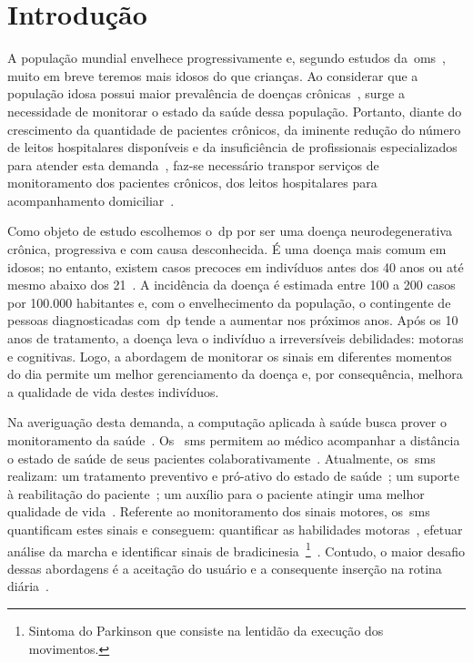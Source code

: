 \chapter{Introdu\c{c}\~{a}o} \label{chapter:intro}

A população mundial envelhece progressivamente e, segundo estudos da~\ac{oms}~\cite{ageing2011}, muito em breve teremos mais idosos do que crianças. Ao considerar que a população idosa possui maior prevalência de doenças crônicas~\cite{prevcronica2009}, surge a necessidade de monitorar o estado da saúde dessa população. Portanto, diante do crescimento da quantidade de pacientes crônicos, da iminente redução do número de leitos hospitalares disponíveis e da insuficiência de profissionais especializados para atender esta demanda~\cite{healthmonitoring2013}, faz-se necessário transpor serviços de monitoramento dos pacientes crônicos, dos leitos hospitalares para acompanhamento domiciliar~\cite{homecarebrazil2011}. 

Como objeto de estudo escolhemos o~\ac{dp} por ser uma doença neurodegenerativa crônica, progressiva e com causa desconhecida. É uma doença mais comum em idosos; no entanto, existem casos precoces em indivíduos antes dos 40 anos ou até mesmo abaixo dos 21~\cite{menezes2003}. A incidência da doença é estimada entre 100 a 200 casos por 100.000 habitantes e, com o envelhecimento da população, o contingente de pessoas diagnosticadas com~\ac{dp} tende a aumentar nos próximos anos. Após os 10 anos de tratamento, a doença leva o indivíduo a irreversíveis debilidades: motoras e cognitivas. Logo, a abordagem de monitorar os sinais em diferentes momentos do dia permite um melhor gerenciamento da doença e, por consequência, melhora a qualidade de vida destes indivíduos.

Na averiguação desta demanda, a computação aplicada à saúde busca prover o monitoramento da saúde~\cite{healthmonitoring2013,berg03,bardram2010,Ballegaard:2008:HEL:1357054.1357336,aarhus_negotiating_2010}. Os ~\ac{sms} permitem ao médico acompanhar a distância o estado de saúde de seus pacientes colaborativamente~\cite{healthmonitoring2013}. Atualmente, os~\ac{sms} realizam: um tratamento preventivo e pró-ativo do estado de saúde~\cite{bardram2010}; um suporte à reabilitação do paciente~\cite{sacbespoke2014}; um auxílio para o paciente atingir uma melhor qualidade de vida~\cite{sacsvmhms2014}. Referente ao monitoramento dos sinais motores, os~\ac{sms} quantificam estes sinais e conseguem: quantificar as habilidades motoras~\cite{manumeterjbhi2014,patel_monitoring_2009}, efetuar análise da marcha \cite{robotgait2014} e identificar sinais de bradicinesia~\footnote{Sintoma do Parkinson que consiste na lentidão da execução dos movimentos.}~\cite{ambulatoryparkinson2010}. Contudo, o maior desafio dessas abordagens é a 
aceitação do usuário e a consequente inserção na rotina diária~\cite{alemdar2015}.



